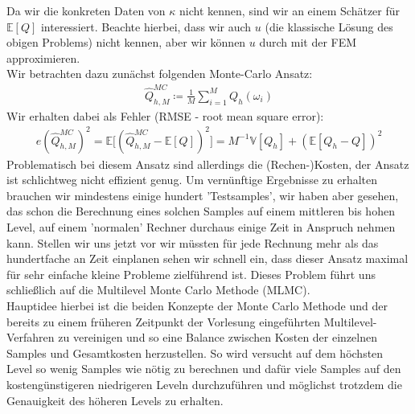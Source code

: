 Da wir die konkreten Daten von $\kappa$ nicht kennen, sind wir an einem Schätzer für $\mathbb{E}[Q]$ interessiert.
Beachte hierbei, dass wir auch $u$ (die klassische Lösung des obigen Problems) nicht kennen, aber wir können $u$ durch mit der FEM approximieren. \\
Wir betrachten dazu zunächst folgenden Monte-Carlo Ansatz:
\begin{align*}
	    \hat{Q}^{MC}_{h,M}  \coloneqq \frac{1}{M} \sum_{i= 1}^{M} Q_h (\omega_i)
\end{align*}
Wir erhalten dabei als Fehler (RMSE - root mean square error):
\begin{align*}
	e(\hat{Q}^{MC}_{h,M})^2 = \mathbb{E} \bigl[ (\hat{Q}^{MC}_{h,M} - \mathbb{E}[Q] )^2\bigr] = M^{-1} \mathbb{V}[ Q_h] + (\mathbb{E}[Q_h -Q])^2
\end{align*}
Problematisch bei diesem Ansatz sind allerdings die (Rechen-)Kosten, der Ansatz ist schlichtweg nicht effizient genug. Um vernünftige Ergebnisse zu erhalten brauchen wir mindestens einige hundert 'Testsamples', wir haben aber gesehen, das schon die Berechnung eines solchen Samples auf einem mittleren bis hohen Level, auf einem 'normalen' Rechner durchaus einige Zeit in Anspruch nehmen kann. Stellen wir uns jetzt vor wir müssten für jede Rechnung mehr als das hundertfache an Zeit einplanen sehen wir schnell ein, dass dieser Ansatz maximal für sehr einfache kleine Probleme zielführend ist.
Dieses Problem führt uns schließlich auf die Multilevel Monte Carlo Methode (MLMC). \\
Hauptidee hierbei ist die beiden Konzepte der Monte Carlo Methode und der bereits zu einem früheren Zeitpunkt der Vorlesung eingeführten Multilevel-Verfahren zu vereinigen und so eine Balance zwischen Kosten der einzelnen Samples und Gesamtkosten herzustellen.
So wird versucht auf dem höchsten Level so wenig Samples wie nötig zu berechnen und dafür viele Samples auf den kostengünstigeren niedrigeren Leveln durchzuführen und möglichst trotzdem die Genauigkeit des höheren Levels zu erhalten.

